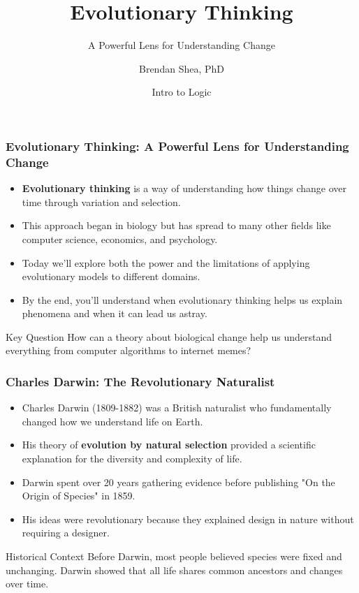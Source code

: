 \documentclass{beamer}
\title{Evolutionary Thinking}
\subtitle{A Powerful Lens for Understanding Change}
\author{Brendan Shea, PhD}
\date{Intro to Logic}
\begin{document}
	
	\frame{\titlepage}
	
	\begin{frame}
		\frametitle{Evolutionary Thinking: A Powerful Lens for Understanding Change}
		\begin{itemize}
			\item \textbf{Evolutionary thinking} is a way of understanding how things change over time through variation and selection.
			\item This approach began in biology but has spread to many other fields like computer science, economics, and psychology.
			\item Today we'll explore both the power and the limitations of applying evolutionary models to different domains.
			\item By the end, you'll understand when evolutionary thinking helps us explain phenomena and when it can lead us astray.
		\end{itemize}
		\begin{alertblock}{Key Question}
			How can a theory about biological change help us understand everything from computer algorithms to internet memes?
		\end{alertblock}
	\end{frame}
	
	\begin{frame}
		\frametitle{Charles Darwin: The Revolutionary Naturalist}
		\begin{itemize}
			\item Charles Darwin (1809-1882) was a British naturalist who fundamentally changed how we understand life on Earth.
			\item His theory of \textbf{evolution by natural selection} provided a scientific explanation for the diversity and complexity of life.
			\item Darwin spent over 20 years gathering evidence before publishing "On the Origin of Species" in 1859.
			\item His ideas were revolutionary because they explained design in nature without requiring a designer.
		\end{itemize}
		\begin{block}{Historical Context}
			Before Darwin, most people believed species were fixed and unchanging. Darwin showed that all life shares common ancestors and changes over time.
		\end{block}
	\end{frame}
	
\end{document}
